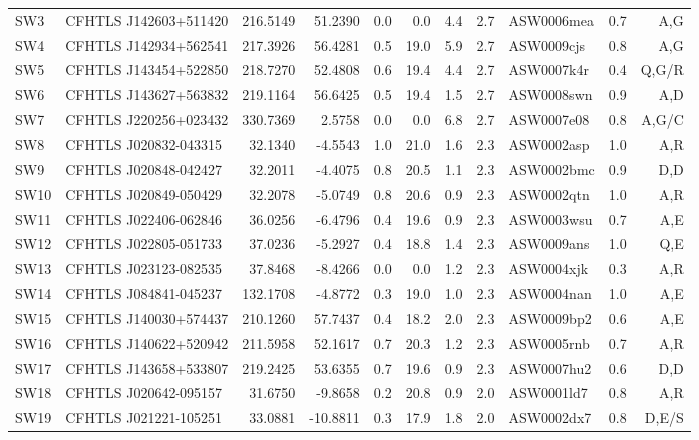 \documentclass[useAMS,usenatbib,a4paper]{mn2e}
\begin{document}
\begin{center}
\begin{longtable}{llrrrrrrlrr}
 SW3 & CFHTLS J142603+511420 &  216.5149 &   51.2390 &  0.0 &  0.0 &  4.4 &  2.7 & ASW0006mea &  0.7  &  A,G   \\
 SW4 & CFHTLS J142934+562541 &  217.3926 &   56.4281 &  0.5 & 19.0 &  5.9 &  2.7 & ASW0009cjs &  0.8  &  A,G   \\
 SW5 & CFHTLS J143454+522850 &  218.7270 &   52.4808 &  0.6 & 19.4 &  4.4 &  2.7 & ASW0007k4r &  0.4  &  Q,G/R   \\
 SW6 & CFHTLS J143627+563832 &  219.1164 &   56.6425 &  0.5 & 19.4 &  1.5 &  2.7 & ASW0008swn &  0.9  &  A,D   \\
 SW7 & CFHTLS J220256+023432 &  330.7369 &    2.5758 &  0.0 &  0.0 &  6.8 &  2.7 & ASW0007e08 &  0.8  &  A,G/C   \\
 SW8 & CFHTLS J020832-043315 &   32.1340 &   -4.5543 &  1.0 & 21.0 &  1.6 &  2.3 & ASW0002asp &  1.0  &  A,R   \\
 SW9 & CFHTLS J020848-042427 &   32.2011 &   -4.4075 &  0.8 & 20.5 &  1.1 &  2.3 & ASW0002bmc &  0.9  &  D,D   \\
SW10 & CFHTLS J020849-050429 &   32.2078 &   -5.0749 &  0.8 & 20.6 &  0.9 &  2.3 & ASW0002qtn &  1.0  &  A,R   \\
SW11 & CFHTLS J022406-062846 &   36.0256 &   -6.4796 &  0.4 & 19.6 &  0.9 &  2.3 & ASW0003wsu &  0.7  &  A,E   \\
SW12 & CFHTLS J022805-051733 &   37.0236 &   -5.2927 &  0.4 & 18.8 &  1.4 &  2.3 & ASW0009ans &  1.0  &  Q,E   \\
SW13 & CFHTLS J023123-082535 &   37.8468 &   -8.4266 &  0.0 &  0.0 &  1.2 &  2.3 & ASW0004xjk &  0.3  &  A,R   \\
SW14 & CFHTLS J084841-045237 &  132.1708 &   -4.8772 &  0.3 & 19.0 &  1.0 &  2.3 & ASW0004nan &  1.0  &  A,E   \\
SW15 & CFHTLS J140030+574437 &  210.1260 &   57.7437 &  0.4 & 18.2 &  2.0 &  2.3 & ASW0009bp2 &  0.6  &  A,E   \\
SW16 & CFHTLS J140622+520942 &  211.5958 &   52.1617 &  0.7 & 20.3 &  1.2 &  2.3 & ASW0005rnb &  0.7  &  A,R   \\
SW17 & CFHTLS J143658+533807 &  219.2425 &   53.6355 &  0.7 & 19.6 &  0.9 &  2.3 & ASW0007hu2 &  0.6  &  D,D   \\
SW18 & CFHTLS J020642-095157 &   31.6750 &   -9.8658 &  0.2 & 20.8 &  0.9 &  2.0 & ASW0001ld7 &  0.8  &  A,R   \\
SW19 & CFHTLS J021221-105251 &   33.0881 &  -10.8811 &  0.3 & 17.9 &  1.8 &  2.0 & ASW0002dx7 &  0.8  &  D,E/S   \\

\end{longtable}
\end{center}
\end{document}
